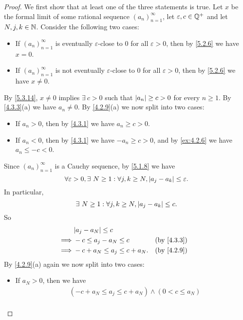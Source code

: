 \begin{proof}
  We first show that at least one of the three statements is true.
  Let \(x\) be the formal limit of some rational sequence \((a_n)_{n = 1}^{\infty}\), let \(\varepsilon, c \in \mathbb{Q}^+\) and let \(N, j, k \in \mathbb{N}\).
  Consider the following two cases:
  \begin{itemize}
    \item If \((a_n)_{n = 1}^{\infty}\) is eventually \(\varepsilon\)-close to \(0\) for all \(\varepsilon > 0\), then by \cref{5.2.6} we have \(x = 0\).
    \item If \((a_n)_{n = 1}^{\infty}\) is not eventually \(\varepsilon\)-close to \(0\) for all \(\varepsilon > 0\), then by \cref{5.2.6} we have \(x \neq 0\).
  \end{itemize}
  By \cref{5.3.14}, \(x \neq 0\) implies \(\exists\ c > 0\) such that \(\left\lvert a_n\right\rvert \geq c > 0\) for every \(n \geq 1\).
  By \cref{4.3.3}(a) we have \(a_n \neq 0\).
  By \cref{4.2.9}(a) we now split into two cases:
  \begin{itemize}
    \item If \(a_n > 0\), then by \cref{4.3.1} we have \(a_n \geq c > 0\).
    \item If \(a_n < 0\), then by \cref{4.3.1} we have \(-a_n \geq c > 0\), and by \cref{ex:4.2.6} we have \(a_n \leq -c < 0\).
  \end{itemize}
  Since \((a_n)_{n = 1}^{\infty}\) is a Cauchy sequence, by \cref{5.1.8} we have
  \[
    \forall \varepsilon > 0, \exists\ N \geq 1 : \forall j, k \geq N, \left\lvert a_j - a_k\right\rvert \leq \varepsilon.
  \]
  In particular,
  \[
    \exists\ N \geq 1 : \forall j, k \geq N, \left\lvert a_j - a_k\right\rvert \leq c.
  \]
  So
  \begin{align*}
             & \abs{a_j - a_N} \leq c                                        \\
    \implies & -c \leq a_j - a_N \leq c        &  & \text{(by \cref{4.3.3})} \\
    \implies & -c + a_N \leq a_j \leq c + a_N. &  & \text{(by \cref{4.2.9})} \\
  \end{align*}
  By \cref{4.2.9}(a) again we now split into two cases:
  \begin{itemize}
    \item If \(a_N > 0\), then we have
          \begin{align*}
                     & (-c + a_N \leq a_j \leq c + a_N) \land (0 < c \leq a_N)                                               \\

\end{align*}
\end{itemize}
\end{proof}
